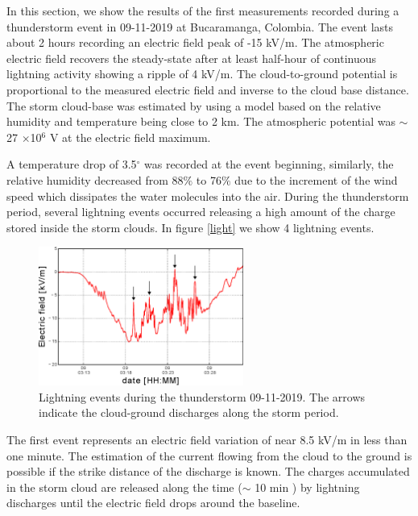 \documentclass[a4paper]{jpconf}
\begin{document}
In this section, we show the results of the first measurements recorded during a thunderstorm event in 09-11-2019 at Bucaramanga, Colombia. The event lasts about 2 hours recording an electric field peak of -15 kV/m. The atmospheric electric field recovers the steady-state after at least half-hour of continuous lightning activity showing a ripple of 4 kV/m. The cloud-to-ground potential is proportional to the measured electric field and inverse to the cloud base distance. The storm cloud-base was estimated by using a model based on the relative humidity and temperature \cite{Lawrence2005} being close to 2 km. The atmospheric potential was $\sim$ 27 $\times$10$^6$ V at the electric field maximum.

A temperature drop of 3.5$^{\circ}$ was recorded at the event beginning, similarly, the relative humidity decreased from 88$\%$ to 76$\%$ due to the increment of the wind speed which dissipates the water molecules into the air. During the thunderstorm period, several lightning events occurred releasing a high amount of the charge stored inside the storm clouds. In figure \ref{light} we show 4 lightning events. 

\begin{figure}[h]
\begin{center}
\includegraphics[width=0.6\textwidth]{Figures/lightning.eps}
\caption{\label{light} Lightning events during the thunderstorm 09-11-2019. The arrows indicate the cloud-ground discharges along the storm period.}
\label{cal_fuente}
\end{center}
\end{figure}
 
The first event represents an electric field variation of near 8.5 kV/m in less than one minute. The estimation of the current flowing from the cloud to the ground is possible if the strike distance of the discharge is known. The charges accumulated in the storm cloud are released along the time ($\sim$ 10 min ) by lightning discharges until the electric field drops around the baseline.
\end{document}

